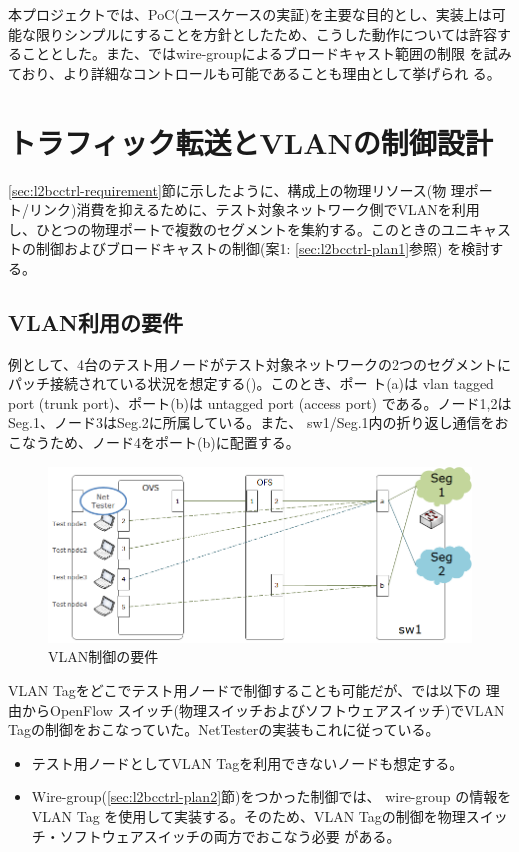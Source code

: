 本プロジェクトでは、PoC(ユースケースの実証)を主要な目的とし、実装上は可
能な限りシンプルにすることを方針としたため、こうした動作については許容す
ることとした。また、\lopj ではwire-groupによるブロードキャスト範囲の制限
を試みており、より詳細なコントロールも可能であることも理由として挙げられ
る。


 \section{トラフィック転送とVLANの制御設計}
 \label{sec:vlan-ctrl}

\ref{sec:l2bcctrl-requirement}節に示したように、構成上の物理リソース(物
理ポート/リンク)消費を抑えるために、テスト対象ネットワーク側でVLANを利用
し、ひとつの物理ポートで複数のセグメントを集約する。このときのユニキャス
トの制御およびブロードキャストの制御(案1: \ref{sec:l2bcctrl-plan1}参照)
を検討する。

  \subsection{VLAN利用の要件}
  \label{sec:vlan-ctrl-req}

例として、4台のテスト用ノードがテスト対象ネットワークの2つのセグメントに
パッチ接続されている状況を想定する()。このとき、ポー
ト(a)は vlan tagged port (trunk port)、ポート(b)は untagged port (access
port) である。ノード1,2はSeg.1、ノード3はSeg.2に所属している。また、
sw1/Seg.1内の折り返し通信をおこなうため、ノード4をポート(b)に配置する。

\begin{figure}[h]
 \centering
 \includegraphics[scale=0.6]{img/vlan-req.png}
 \caption{VLAN制御の要件}
 \label{fig:vlan-req}
\end{figure}

VLAN Tagをどこでテスト用ノードで制御することも可能だが、\lopj では以下の
理由からOpenFlow スイッチ(物理スイッチおよびソフトウェアスイッチ)でVLAN
Tagの制御をおこなっていた。NetTesterの実装もこれに従っている。
\begin{itemize}
 \item テスト用ノードとしてVLAN Tagを利用できないノードも想定する。
 \item Wire-group(\ref{sec:l2bcctrl-plan2}節)をつかった制御では、
       wire-group の情報をVLAN Tag を使用して実装する。そのため、VLAN
       Tagの制御を物理スイッチ・ソフトウェアスイッチの両方でおこなう必要
       がある。
\end{itemize}

